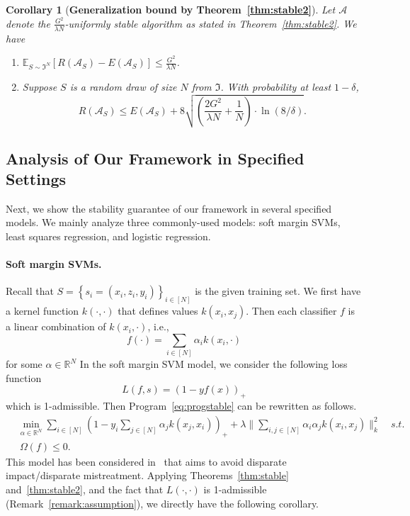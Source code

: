 \documentclass[11pt]{article}
\newcommand{\Exp}{\mathbb{E}}
\newtheorem{corollary}[theorem]{Corollary}
\newcommand{\R}{\mathbb{R}}
\newcommand{\calA}{\mathcal{A}}
\begin{document}
	
	\begin{corollary}[\bf Generalization bound by Theorem~\ref{thm:stable2}]
		\label{cor:gen2}
		Let $\calA$ denote the $\frac{G^2}{\lambda N}$-uniformly stable algorithm as stated in Theorem~\ref{thm:stable2}.
		We have
		\begin{enumerate}
			\item $\Exp_{S\sim \Im^N}\left[R(\calA_S)-E(\calA_S)\right]\leq \frac{G^2}{\lambda N}$.
			\item Suppose $S$ is a random draw of size $N$ from $\Im$. 
			With probability at least $1-\delta$, 
			\[
			R(\calA_S)\leq E(\calA_S) + 8\sqrt{\left(\frac{2G^2}{\lambda N} +\frac{1}{N} \right) \cdot\ln (8/\delta)}.
			\]
		\end{enumerate}
	\end{corollary}

	\subsection{Analysis of Our Framework in Specified Settings}
	\label{sec:specified}
	
	
	Next, we show the stability guarantee of our framework in several specified models. %
	We mainly analyze three commonly-used models: soft margin SVMs, least squares regression, and logistic regression.
	
	
	\paragraph{Soft margin SVMs.}
	Recall that $S=\left\{s_i=\left(x_i,z_i,y_i\right)\right\}_{i\in [N]}$ is the given training set.
	We first have a kernel function $k(\cdot,\cdot)$ that defines values $k(x_i,x_j)$. 
	Then each classifier $f$ is a linear combination of $k(x_i,\cdot)$, i.e.,
	\[
	f(\cdot) = \sum_{i\in [N]} \alpha_i k(x_i,\cdot)
	\]
	for some $\alpha\in \R^N$
	In the soft margin SVM model, we consider the following loss function
	\[
	L(f,s) = (1-yf(x))_+
	\]
	which is 1-admissible.
	Then Program~\eqref{eq:progstable} can be rewritten as follows.
	\begin{equation} \tag{SVM}
	\label{eq:SVM}
	\begin{split}
	& \min_{\alpha\in \R^N} \sum_{i\in [N]} \left(1-y_i \sum_{j\in [N]} \alpha_j k(x_j,x_i)\right)_+ + \lambda \|\sum_{i,j\in [N]}\alpha_i \alpha_j k(x_i,x_j)\|_k^2 \quad s.t. \\
	& ~ \Omega(f)\leq 0.
	\end{split}
	\end{equation}
	This model has been considered in~\cite{zafar2017fairness,zafar2017fair} that aims to avoid disparate impact/disparate mistreatment.
	Applying Theorems~\ref{thm:stable} and~\ref{thm:stable2}, and the fact that $L(\cdot,\cdot)$ is 1-admissible (Remark~\ref{remark:assumption}), we directly have the following corollary.
	
\end{document}
